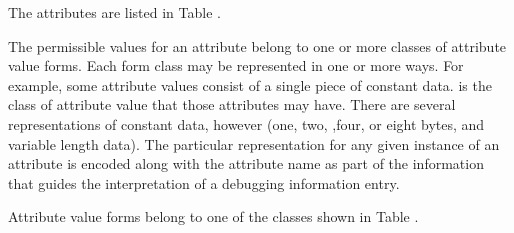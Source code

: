 The attributes are listed in Table .  

The permissible values
for an attribute belong to one or more classes of attribute
value forms.  
Each form class may be represented in one or more ways. 
For example, some attribute values consist
of a single piece of constant data. 
is the class of attribute value that those attributes may have. 
There are several representations of constant data,
however (one, two, ,four, or eight bytes, and variable length
data). 
The particular representation for any given instance
of an attribute is encoded along with the attribute name as
part of the information that guides the interpretation of a
debugging information entry.  

Attribute value forms belong
to one of the classes shown in Table .

